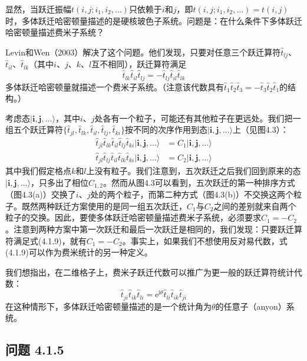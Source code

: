 显然，当跃迁振幅$t(i,j;i_1,i_2,\ldots)$只依赖于$i$和$j$，即$t(i,j;i_1,i_2,\ldots)=t(i,j)$时，多体跃迁哈密顿量描述的是硬核玻色子系统。问题是：在什么条件下多体跃迁哈密顿量描述费米子系统？

Levin和Wen（2003）解决了这个问题。他们发现，只要对任意三个跃迁算符$\hat{t}_{lj}$、$\hat{t}_{il}$、$\hat{t}_{lk}$（其中$i$、$j$、$k$、$l$互不相同），跃迁算符满足
\begin{equation*}
\hat{t}_{lk}\hat{t}_{il}\hat{t}_{lj}=-\hat{t}_{lj}\hat{t}_{il}\hat{t}_{lk}\tag{4.1.9}
\end{equation*}
多体跃迁哈密顿量就描述一个费米子系统。（注意该代数具有$\hat{t}_1\hat{t}_2\hat{t}_3=-\hat{t}_3\hat{t}_2\hat{t}_1$的结构。）

考虑态$|\pmb{i},\pmb{j},\ldots\rangle$，其中$i$、$j$处各有一个粒子，可能还有其他粒子在更远处。我们把一组五个跃迁算符$\{\hat{t}_{jl},\hat{t}_{lk},\hat{t}_{il},\hat{t}_{lj},\hat{t}_{ki}\}$按不同的次序作用到态$|\pmb{i},\pmb{j},\ldots\rangle$上（见图4.3）：
\begin{align*}
\hat{t}_{jl}\hat{t}_{lk}\hat{t}_{il}\hat{t}_{lj}\hat{t}_{ki}|\pmb{i},\pmb{j},\ldots\rangle&=C_1|\pmb{i},\pmb{j},\ldots\rangle\\
\hat{t}_{jl}\hat{t}_{lj}\hat{t}_{il}\hat{t}_{lk}\hat{t}_{ki}|\pmb{i},\pmb{j},\ldots\rangle&=C_2|\pmb{i},\pmb{j},\ldots\rangle
\end{align*}
其中我们假定格点$k$和$l$上没有粒子。我们注意到，五次跃迁之后我们回到原来的态$|\pmb{i},\pmb{j},\ldots\rangle$，只多出了相位$C_{1,2}$。然而从图4.3可以看到，五次跃迁的第一种排序方式（图4.3(a)）交换了$i$、$j$处的两个粒子，而第二种方式（图4.3(b)）不交换这两个粒子。既然两种跃迁方案使用的是同一组五次跃迁，$C_1$与$C_2$之间的差别就来自两个粒子的交换。因此，要使多体跃迁哈密顿量描述费米子系统，必须要求$C_1=-C_2$。注意到两种方案中第一次跃迁和最后一次跃迁是相同的，我们发现：只要跃迁算符满足式(4.1.9)，就有$C_1=-C_2$。事实上，如果我们不想使用反对易代数，式(4.1.9)可以作为费米统计的另一种定义。

我们想指出，在二维格子上，费米子跃迁代数可以推广为更一般的跃迁算符统计代数：
\begin{equation*}
\hat{t}_{ji}\hat{t}_{ik}\hat{t}_{li}=\mathrm{e}^{\mathrm{i}\theta}\hat{t}_{li}\hat{t}_{ik}\hat{t}_{ji}\tag{4.1.10}
\end{equation*}
在这种情形下，多体跃迁哈密顿量描述的是一个统计角为$\theta$的任意子（anyon）系统。

\subsection*{问题 4.1.5}

